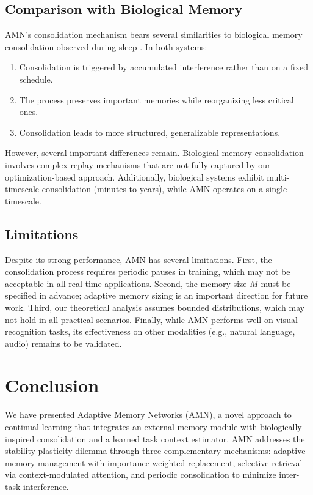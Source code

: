 \documentclass[11pt]{article}
\begin{document}
\subsection{Comparison with Biological Memory}

AMN's consolidation mechanism bears several similarities to biological memory consolidation observed during sleep \citep{walker2017sleep}. In both systems:
\begin{enumerate}
    \item Consolidation is triggered by accumulated interference rather than on a fixed schedule.
    \item The process preserves important memories while reorganizing less critical ones.
    \item Consolidation leads to more structured, generalizable representations.
\end{enumerate}

However, several important differences remain. Biological memory consolidation involves complex replay mechanisms that are not fully captured by our optimization-based approach. Additionally, biological systems exhibit multi-timescale consolidation (minutes to years), while AMN operates on a single timescale.

\subsection{Limitations}

Despite its strong performance, AMN has several limitations. First, the consolidation process requires periodic pauses in training, which may not be acceptable in all real-time applications. Second, the memory size $M$ must be specified in advance; adaptive memory sizing is an important direction for future work. Third, our theoretical analysis assumes bounded distributions, which may not hold in all practical scenarios. Finally, while AMN performs well on visual recognition tasks, its effectiveness on other modalities (e.g., natural language, audio) remains to be validated.

\section{Conclusion}
\label{sec:conclusion}

We have presented Adaptive Memory Networks (AMN), a novel approach to continual learning that integrates an external memory module with biologically-inspired consolidation and a learned task context estimator. AMN addresses the stability-plasticity dilemma through three complementary mechanisms: adaptive memory management with importance-weighted replacement, selective retrieval via context-modulated attention, and periodic consolidation to minimize inter-task interference.
\end{document}
